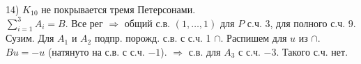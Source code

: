 14) $K_{10}$ не покрывается тремя Петерсонами.\\
$\sum\limits_{i=1}^3 A_i = B$. Все рег $\Rightarrow$ общий с.в. $(1,\dots,1)$ для $P$ с.ч. 3, для полного с.ч. $9$. Сузим. Для $A_1$ и $A_2$ подпр. порожд. с.в. с с.ч. 1 $\cap$. Распишем для $u$ из $\cap$. $Bu = -u$ (натянуто на с.в. с с.ч. $-1$). $\Rightarrow$ с.в. для $A_3$ с с.ч. $-3$. Такого с.ч. нет.\\
